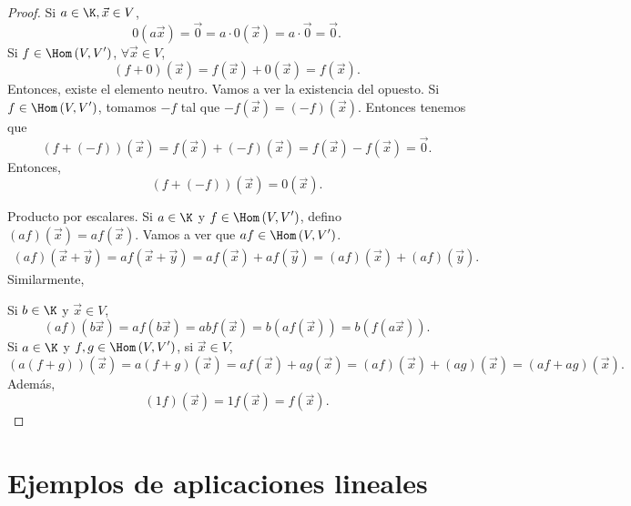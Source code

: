 \begin{proof}
Si $\displaystyle a \in \K, \vec{x} \in V $, 
\[0\left(a\vec{x}\right) = \vec{0} = a \cdot 0\left(\vec{x}\right) = a \cdot \vec{0} = \vec{0} .\]
Si $\displaystyle f \in \Hom\left(V, V'\right) $, $\displaystyle \forall \vec{x} \in V $, 
\[ \left(f+0\right)\left(\vec{x}\right) = f\left(\vec{x}\right) + 0\left(\vec{x}\right) = f\left(\vec{x}\right) .\]
Entonces, existe el elemento neutro. Vamos a ver la existencia del opuesto. Si $\displaystyle f \in \Hom\left(V, V'\right) $, tomamos $\displaystyle -f $ tal que $\displaystyle -f\left(\vec{x}\right) = \left(-f\right)\left(\vec{x}\right) $. Entonces tenemos que
\[\left(f+\left(-f\right)\right)\left(\vec{x}\right) = f\left(\vec{x}\right) + \left(-f\right)\left(\vec{x}\right) = f\left(\vec{x}\right)-f\left(\vec{x}\right) = \vec{0} .\]
Entonces, 
\[\left(f+\left(-f\right)\right)\left(\vec{x}\right) = 0\left(\vec{x}\right) .\]

Producto por escalares. Si $\displaystyle a \in \K $ y $\displaystyle f \in \Hom\left(V, V'\right) $, defino $\displaystyle \left(af\right)\left(\vec{x}\right) = af\left(\vec{x}\right) $. Vamos a ver que $\displaystyle af \in \Hom\left(V, V'\right) $.
\[
\begin{split}
	\left(af\right)\left(\vec{x}+\vec{y}\right) = af\left(\vec{x}+\vec{y}\right) = af\left(\vec{x}\right) + a f\left(\vec{y}\right) = \left(af\right)\left(\vec{x}\right)+ \left(af\right)\left(\vec{y}\right)  .
\end{split}
\]
Similarmente, 

Si $\displaystyle b \in \K $ y $\displaystyle \vec{x} \in V $, 
\[\left(af\right)\left(b\vec{x}\right) = af\left(b\vec{x}\right) = abf\left(\vec{x}\right) = b\left(af\left(\vec{x}\right)\right) = b\left(f\left(a\vec{x}\right)\right) .\]
Si $\displaystyle a \in \K $ y $\displaystyle f, g \in \Hom\left(V, V'\right) $, si $\displaystyle \vec{x}\in V $, 
\[\left(a\left(f+g\right)\right)\left(\vec{x}\right) = a\left(f+g\right)\left(\vec{x}\right) = af\left(\vec{x}\right) + a g\left(\vec{x}\right) = \left(af\right)\left(\vec{x}\right) + \left(ag\right)\left(\vec{x}\right) = \left(af+ag\right)\left(\vec{x}\right) .\]
Además, 
\[\left(1f\right)\left(\vec{x}\right) = 1 f\left(\vec{x}\right) = f\left(\vec{x}\right) .\]
\end{proof}

\section{Ejemplos de aplicaciones lineales}

